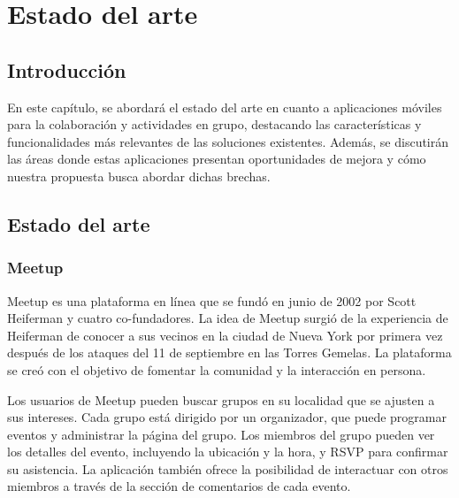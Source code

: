 \chapter{Estado del arte}
\section{Introducción}
En este capítulo, se abordará el estado del arte en
cuanto a aplicaciones móviles para la colaboración y
actividades en grupo, destacando las características y
funcionalidades más relevantes de las soluciones existentes.
Además, se discutirán las áreas donde estas aplicaciones
presentan oportunidades de mejora y cómo nuestra propuesta
busca abordar dichas brechas.

\section{Estado del arte}
\subsection{Meetup}
Meetup es una plataforma en línea que se fundó en junio de 2002 por Scott Heiferman 
y cuatro co-fundadores. La idea de Meetup surgió de la experiencia de Heiferman de 
conocer a sus vecinos en la ciudad de Nueva York por primera vez después de los 
ataques del 11 de septiembre en las Torres Gemelas. La plataforma se creó con el 
objetivo de fomentar la comunidad y la interacción en persona.

Los usuarios de Meetup pueden buscar grupos en su localidad que se
ajusten a sus intereses. Cada grupo está dirigido por un organizador, 
que puede programar eventos y administrar la página del grupo. Los 
miembros del grupo pueden ver los detalles del evento, incluyendo 
la ubicación y la hora, y RSVP para confirmar su asistencia. La 
aplicación también ofrece la posibilidad de interactuar con otros 
miembros a través de la sección de comentarios de cada evento.

